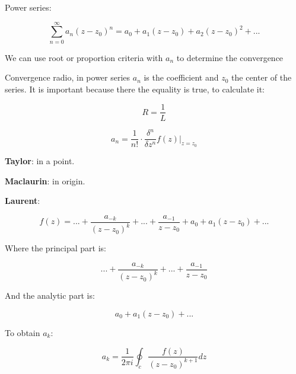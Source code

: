 \documentclass[letterpaper]{article}
\newcommand{\divline}{\noindent\makebox[\linewidth]{\rule{\textwidth}{0.4pt}}}
\begin{document}
\begin{multicols}{2}
			Power series:
			
			\[ \sum_{n = 0}^{\infty} a_{n} (z - z_0)^{n} = a_0 + a_{1}(z-z_0) +a_{2}(z-z_0)^{2} + ... \]
			
			We can use root or proportion criteria with \(a_{n}\) to determine the convergence
			
			Convergence radio, in power series \(a_{n}\) is the coefficient and \(z_0\) the center of the series. It is important because there the equality is true, to calculate it:
			
			\[R = \frac{1}{L}\]
			
			\[a_n = \frac{1}{n!} \cdot \frac{\delta^{n}}{\delta z^{n}} f(z) |_{z=z_0} \]
			
			\textbf{Taylor}: in a point.
			
			\textbf{Maclaurin}: in origin.
			
			\textbf{Laurent}:
			
			\[f(z) = ... + \frac{a_{-k}}{(z-z_0)^{k}} + ... + \frac{a_{-1}}{z-z_0} + a_0 + a_{1}(z-z_0) + ...\]
			
			Where the principal part is:
			
			\[... + \frac{a_{-k}}{(z-z_0)^{k}} + ... + \frac{a_{-1}}{z-z_0}\]
			
			And the analytic part is:
			
			\[a_0 + a_{1}(z-z_0) + ...\]
			
			To obtain \(a_k\):
			
			\[a_k = \frac{1}{2 \pi i} \oint_{c} \frac{f(z)}{(z-z_0)^{k+1}} dz \]
			
	\end{multicols}
 
	\divline
 
\end{document}
